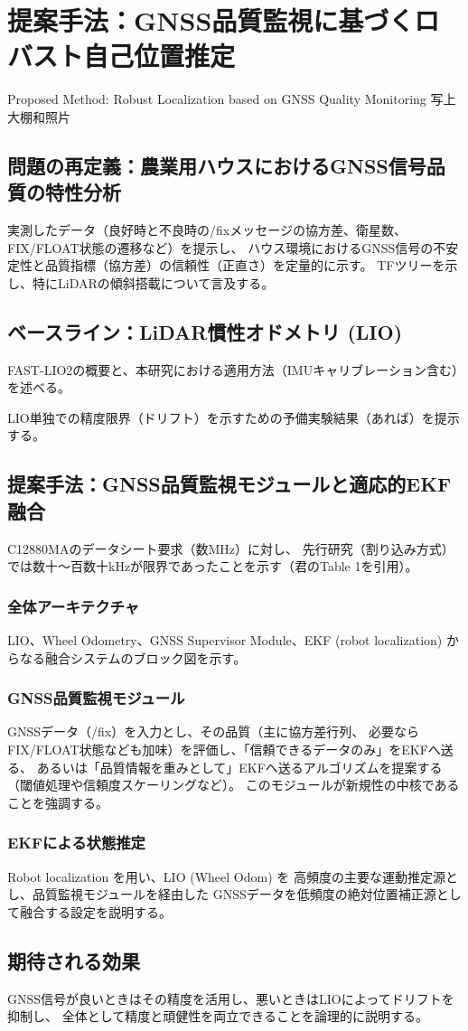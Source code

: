 \documentclass[main]{subfiles}
\begin{document}
\chapter{提案手法：GNSS品質監視に基づくロバスト自己位置推定}
Proposed Method: Robust Localization based on GNSS Quality Monitoring
写上大棚和照片
\section{問題の再定義：農業用ハウスにおけるGNSS信号品質の特性分析}
実測したデータ（良好時と不良時の/fixメッセージの協方差、衛星数、FIX/FLOAT状態の遷移など）を提示し、
ハウス環境におけるGNSS信号の不安定性と品質指標（協方差）の信頼性（正直さ）を定量的に示す。
TFツリーを示し、特にLiDARの傾斜搭載について言及する。

\section{ベースライン：LiDAR慣性オドメトリ (LIO)}
FAST-LIO2の概要と、本研究における適用方法（IMUキャリブレーション含む）を述べる。

LIO単独での精度限界（ドリフト）を示すための予備実験結果（あれば）を提示する。

\section{提案手法：GNSS品質監視モジュールと適応的EKF融合} 
C12880MAのデータシート要求（数MHz）に対し、
先行研究（割り込み方式）では数十～百数十kHzが限界であったことを示す（君のTable 1を引用）。


\subsection{全体アーキテクチャ} 
LIO、Wheel Odometry、GNSS Supervisor Module、EKF (robot localization) からなる融合システムのブロック図を示す。

\subsection{GNSS品質監視モジュール}
GNSSデータ（/fix）を入力とし、その品質（主に協方差行列、
必要ならFIX/FLOAT状態なども加味）を評価し、「信頼できるデータのみ」をEKFへ送る、
あるいは「品質情報を重みとして」EKFへ送るアルゴリズムを提案する（閾値処理や信頼度スケーリングなど）。
このモジュールが新規性の中核であることを強調する。

\subsection{EKFによる状態推定} 
Robot localization を用い、LIO (Wheel Odom) を
高頻度の主要な運動推定源とし、品質監視モジュールを経由した
GNSSデータを低頻度の絶対位置補正源として融合する設定を説明する。

\section{期待される効果}
GNSS信号が良いときはその精度を活用し、悪いときはLIOによってドリフトを抑制し、
全体として精度と頑健性を両立できることを論理的に説明する。
\end{document}
